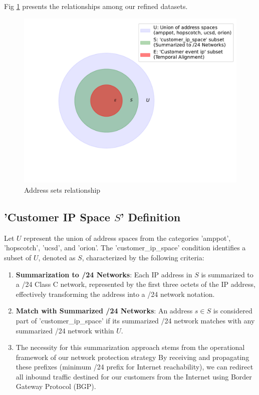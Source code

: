 Fig \ref{fig:addresssets} presents the relationships among our refined datasets. 

\begin{figure}[htbp]
    \centering
    \includegraphics[scale=0.5]{graphs/sets.pdf}
    \caption{Address sets relationship}
    \label{fig:addresssets}
\end{figure}

\subsection{'Customer IP Space $S$' Definition}
Let $U$ represent the union of address spaces from the categories 'amppot', 'hopscotch', 'ucsd', and 'orion'. The 'customer\_ip\_space' condition identifies a subset of $U$, denoted as $S$, characterized by the following criteria:
\begin{enumerate}
    \item \textbf{Summarization to /24 Networks}: Each IP address in $S$ is summarized to a /24 Class C network, represented by the first three octets of the IP address, effectively transforming the address into a /24 network notation. 
    \item \textbf{Match with Summarized /24 Networks}: An address $s \in S$ is considered part of 'customer\_ip\_space' if its summarized /24 network matches with any summarized /24 network within $U$.
    \item The necessity for this summarization approach stems from the operational framework of our network protection strategy By receiving and propagating these prefixes (minimum /24 prefix for Internet reachability), we can redirect all inbound traffic destined for our customers from the Internet using Border Gateway Protocol (BGP). 
\end{enumerate}

